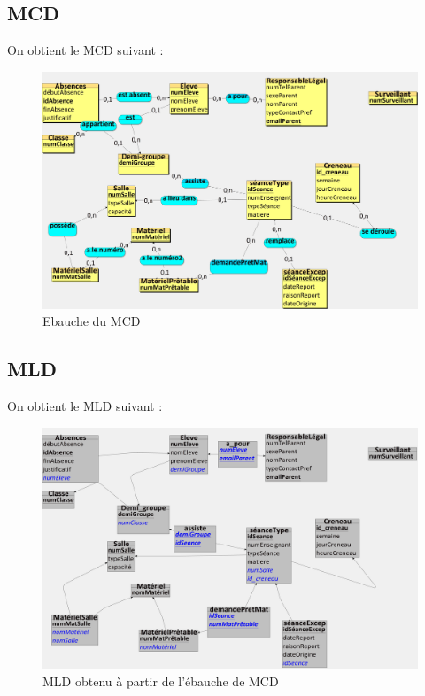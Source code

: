 \documentclass[12pt,french,titlepage]{article}
\begin{document}
	   \subsection{MCD}
	   On obtient le MCD suivant :
    \begin{figure}[H]
	      \centering
	      \includegraphics[scale=0.08]{./ebauche_mcd.jpg}
	      \caption{Ebauche du MCD}
	      
	   
	      
	  \end{figure}
	  
	  \subsection{MLD}
	  
	  On obtient le MLD suivant :

    \begin{figure}[H]
	      \centering
	      \includegraphics[scale=0.08]{./ebauche_mld.jpg}
	      \caption{MLD obtenu à partir de l'ébauche de MCD}
	      
	   
	      
	  \end{figure}
    
\end{document}
